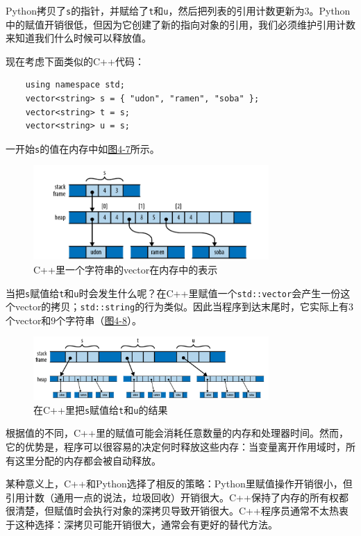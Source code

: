 Python拷贝了\texttt{s}的指针，并赋给了\texttt{t}和\texttt{u}，然后把列表的引用计数更新为3。Python中的赋值开销很低，但因为它创建了新的指向对象的引用，我们必须维护引用计数来知道我们什么时候可以释放值。

现在考虑下面类似的C++代码：
\begin{verbatim}
    using namespace std;
    vector<string> s = { "udon", "ramen", "soba" };
    vector<string> t = s;
    vector<string> u = s;
\end{verbatim}

一开始\texttt{s}的值在内存中如\hyperref[f4-7]{图4-7}所示。

\begin{figure}[htbp]
    \centering
    \includegraphics[width=0.8\textwidth]{../img/f4-7.png}
    \caption{C++里一个字符串的vector在内存中的表示}
    \label{f4-7}
\end{figure}

当把\texttt{s}赋值给\texttt{t}和\texttt{u}时会发生什么呢？在C++里赋值一个\texttt{std::vector}会产生一份这个vector的拷贝；\texttt{std::string}的行为类似。因此当程序到达末尾时，它实际上有3个vector和9个字符串（\hyperref[f4-8]{图4-8}）。

\begin{figure}[htbp]
    \centering
    \includegraphics[width=0.8\textwidth]{../img/f4-8.png}
    \caption{在C++里把\texttt{s}赋值给\texttt{t}和\texttt{u}的结果}
    \label{f4-8}
\end{figure}

根据值的不同，C++里的赋值可能会消耗任意数量的内存和处理器时间。然而，它的优势是，程序可以很容易的决定何时释放这些内存：当变量离开作用域时，所有这里分配的内存都会被自动释放。

某种意义上，C++和Python选择了相反的策略：Python里赋值操作开销很小，但引用计数（通用一点的说法，垃圾回收）开销很大。C++保持了内存的所有权都很清楚，但赋值时会执行对象的深拷贝导致开销很大。C++程序员通常不太热衷于这种选择：深拷贝可能开销很大，通常会有更好的替代方法。

